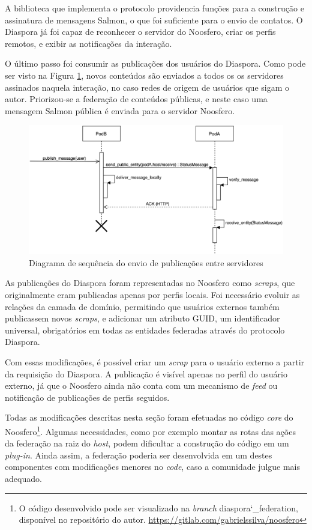 A biblioteca que implementa o protocolo providencia funções para a construção e
assinatura de mensagens Salmon, o que foi suficiente para o envio de contatos. O
Diaspora já foi capaz de reconhecer o servidor do Noosfero, criar os perfis remotos,
e exibir as notificações da interação.

O último passo foi consumir as publicações dos usuários do Diaspora. Como pode ser
visto na Figura \ref{fig:seq_publicacao}, novos conteúdos são enviados a todos os
os servidores assinados naquela interação, no caso redes de origem de usuários que
sigam o autor. Priorizou-se a federação de conteúdos públicas, e neste caso uma
mensagem Salmon pública é enviada para o servidor Noosfero.

\begin{figure}[h]
	\centering
		\includegraphics[keepaspectratio=true,scale=0.6]{figuras/seq_publicacao.eps}
	\caption{Diagrama de sequência do envio de publicações entre servidores}
	\label{fig:seq_publicacao}
\end{figure}

As publicações do Diaspora foram representadas no Noosfero como \textit{scraps}, que
originalmente eram publicadas apenas por perfis locais. Foi necessário evoluir as
relações da camada de domínio, permitindo que usuários externos também publicassem
novos \textit{scraps}, e adicionar um atributo GUID, um identificador universal,
obrigatórios em todas as entidades federadas através do protocolo Diaspora.

Com essas modificações, é possível criar um \textit{scrap} para o usuário externo a
partir da requisição do Diaspora. A publicação é visível apenas no perfil do usuário
externo, já que o Noosfero ainda não conta com um mecanismo de \textit{feed} ou
notificação de publicações de perfis seguidos.

Todas as modificações descritas nesta seção foram efetuadas no código \textit{core}
do Noosfero\footnote{O código desenvolvido pode ser visualizado na \textit{branch}
diaspora\char`_federation, disponível no repositório do autor.
\url{https://gitlab.com/gabrielssilva/noosfero}}. Algumas necessidades, como por
exemplo montar as rotas das ações da federação na raiz do \textit{host}, podem
dificultar a construção do código em um \textit{plug-in}. Ainda assim, a federação
poderia ser desenvolvida em um destes componentes com modificações menores no
\textit{code}, caso a comunidade julgue mais adequado.
